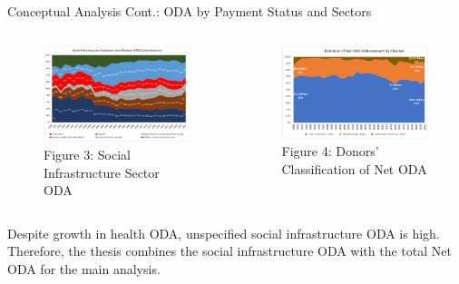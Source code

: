 \documentclass[aspectratio=169,handout, 10pt]{beamer}
\begin{document}
\begin{frame}{Conceptual Analysis Cont.: ODA by Payment Status and Sectors}

\begin{columns}

            \begin{figure}
            \caption{Figure 3: Social Infrastructure Sector ODA}
            \includegraphics[width = \textwidth]{Figures and Tables/Subsectors_soc_inf.pdf}
        \end{figure}


   \begin{figure}
   \caption{Figure 4: Donors' Classification of Net ODA}
            \includegraphics[width=\textwidth]{Figures and Tables/Evolution_Net_ODA.pdf}
            
        \end{figure}

        
    \end{columns}
\footnotesize{Despite growth in health ODA, unspecified social infrastructure ODA is high. Therefore, the thesis combines the social infrastructure ODA with the total Net ODA for the main analysis.}

\end{frame}
\end{document}
